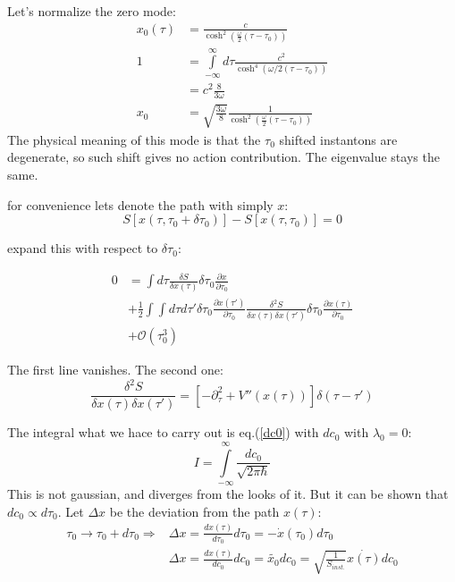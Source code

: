 \documentclass[12pt,a4paper]{article}
\numberwithin{equation}{section}
\begin{document}
Let's normalize the zero mode:
\begin{align}
x_0 (\tau) &= \frac{c}{\cosh^2\left( \frac{\omega}{2} (\tau - \tau_0)  \right)} \\
1 &= \int\limits_{-\infty}^\infty d\tau \frac{c^2}{\cosh^4 (\omega/2 (\tau - \tau_0))}\\
&= c^2 \frac{8}{3\omega}\\
x_0  &=\sqrt{ \frac{3\omega}{8}}\frac{1}{\cosh^2\left( \frac{\omega}{2} (\tau - \tau_0)  \right)}
\end{align}
The physical meaning of this mode is that the $\tau_0$ shifted instantons are degenerate, so such shift gives no action contribution. The eigenvalue stays the same.

for convenience lets denote the path with simply $x$:
\begin{equation}
S[x(\tau,\tau_0 + \delta\tau_0)] - S[x(\tau,\tau_0)] = 0
\end{equation}

expand this with respect to $\delta \tau_0$:


\begin{align}
0 &= \int d\tau \frac{\delta S}{\delta x(\tau)} \delta\tau_0 \frac{\partial x}{\partial \tau_0} \\
&+\frac{1}{2} \int \int d\tau d\tau' \delta \tau_0 \frac{\partial x(\tau')}{\partial \tau_0} \frac{\delta^2 S}{\delta x(\tau) \delta x(\tau') } \delta\tau_0 \frac{\partial x(\tau) }{\partial \tau_0} \\
&+ \mathcal{O}(\tau_0 ^3)
\end{align}

The first line vanishes. The second one:
\begin{equation}
\frac{\delta^2 S}{\delta x(\tau) \delta x(\tau') } = [-\partial_\tau ^2 + V'' (x(\tau))] \delta(\tau - \tau')
\end{equation}

The integral what we hace to carry out is eq.(\ref{dc0}) with $dc_0$ with $\lambda_0 = 0$:
\begin{equation}
I = \int\limits_{-\infty}^\infty \frac{dc_0}{\sqrt{2 \pi \hbar}}
\end{equation}
This is not gaussian, and diverges from the looks of it. But it can be shown that $dc_0 \propto d\tau_0$.
Let $\Delta x$ be the deviation from the path $x(\tau)$:
\begin{align}
\tau_0 \rightarrow \tau_0 + d\tau_0 \Rightarrow &\Delta x = \frac{dx(\tau)}{d\tau_0} d\tau_0 = -\dot{x}(\tau_0)d\tau_0 \\
&\Delta x = \frac{dx(\tau)}{dc_0} dc_0 = \tilde{x_0}dc_0 = \sqrt{\frac{1}{S_{inst.}}} \dot{x(\tau)}dc_0
\end{align}
\end{document}
